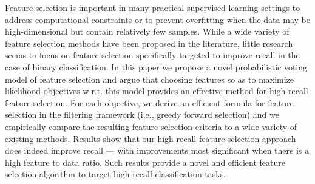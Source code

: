 Feature selection is important in many practical supervised learning
settings to address computational constraints or to prevent
overfitting when the data may be high-dimensional but contain
relatively few samples.  While a wide variety of feature selection
methods have been proposed in the literature, little research seems to
focus on feature selection specifically targeted to improve recall in
the case of binary classification.  In this paper we propose a novel
probabilistic voting model of feature selection and argue that
choosing features so as to maximize likelihood objectives w.r.t. this
model provides an effective method for high recall feature selection.
For each objective, we derive an efficient formula for feature
selection in the filtering framework (i.e., greedy forward selection)
and we empirically compare the resulting feature selection criteria to
a wide variety of existing methods.  Results show that our high recall
feature selection approach does indeed improve recall --- with
improvements most significant when there is a high feature to data ratio.
Such results provide a novel and efficient feature selection algorithm
to target high-recall classification tasks.



